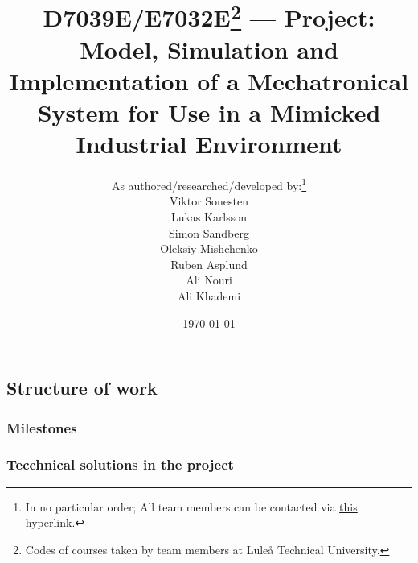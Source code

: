 \documentclass[twocolumn]{article}
\title{
D7039E/E7032E\footnote{Codes of courses taken by team members at Luleå Technical University.}
--- Project: Model, Simulation and Implementation of a Mechatronical System for Use in a Mimicked Industrial Environment
}
\author{
As authored/researched/developed by:\footnote{In no particular order; All team members can be contacted via \href{mailto:vikson-6@student.ltu.se;lukkar-4@student.ltu.se;sansim-6@student.ltu.se;olemis-6@student.ltu.se;rubasp-6@student.ltu.se;alinou-6@student.ltu.se;alikhar-6@student.ltu.se}{this hyperlink}.} \\
Viktor Sonesten \hypermail{vikson-6@student.ltu.se} \\
Lukas Karlsson \hypermail{lukkar-4@student.ltu.se} \\
Simon Sandberg \hypermail{sansim-6@student.ltu.se} \\
Oleksiy Mishchenko \hypermail{olemis-6@student.ltu.se} \\
Ruben Asplund \hypermail{rubasp-6@student.ltu.se} \\
Ali Nouri \hypermail{alinou-6@student.ltu.se} \\
Ali Khademi \hypermail{alikha-6@student.ltu.se}
}
\date{\today}                   %
\begin{document}
\maketitle







\appendix




\subsection{Structure of work}
\subsubsection{Milestones}
\subsubsection{Tecchnical solutions in the project}

\printbibliography
\end{document}
